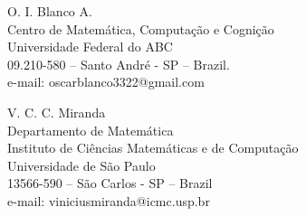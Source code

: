 \documentclass[12 pt]{article}%
\newtheorem{final remark}[theorem]{Final Remark}
\begin{document}
\noindent O. I. Blanco A.\\
Centro de Matem\'atica, Computa\c c\~ao e Cogni\c c\~ao \\
Universidade Federal do ABC \\
09.210-580 -- Santo André - SP -- Brazil.  \\
e-mail: oscarblanco3322@gmail.com


\medskip

\noindent V. C. C. Miranda\\
Departamento de Matemática\\
Instituto de Ciências Matemáticas e de Computação \\
Universidade de São Paulo \\
13566-590 -- São Carlos - SP -- Brazil  \\
e-mail: viniciusmiranda@icmc.usp.br
\end{document}
